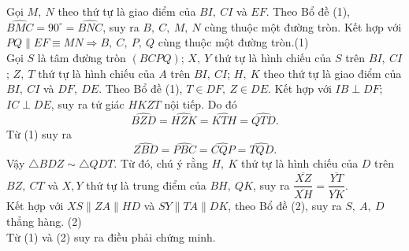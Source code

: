 \begin{bt}
{\begin{center}
		\end{center}
		Gọi $M,~N$ theo thứ tự là giao điểm của $BI,~CI$ và $EF$.
		Theo Bổ đề (1), $\widehat{BMC}=90^\circ=\widehat{BNC}$, suy ra $B,~C,~M,~N$ cùng thuộc một đường tròn.
		Kết hợp với $PQ\parallel EF\equiv MN\Rightarrow B,~C,~P,~Q$ cùng thuộc một đường tròn.\hfill(1)\\
		Gọi $S$ là tâm đường tròn $(BCPQ)$; $X,~Y$ thứ tự là hình chiếu của $S$ trên $BI,~CI$; $Z,~T$ thứ tự là hình chiếu của $A$ trên $BI,~CI$; $H,~K$ theo thứ tự là giao điểm của $BI,~CI$ và $DF,~DE$.
		Theo Bổ đề (1), $T\in DF,~Z\in DE$. Kết hợp với $IB\perp DF$; $IC\perp DE$, suy ra tứ giác $HKZT$ nội tiếp.
		Do đó 
		\[\widehat{BZD}=\widehat{HZK}=\widehat{KTH}=\widehat{QTD}.\] 
		Từ (1) suy ra \[\widehat{ZBD}=\widehat{PBC}=\widehat{CQP}=\widehat{TQD}.\]
		Vậy $\triangle BDZ \sim \triangle QDT$. Từ đó, chú ý rằng $H,~K$ thứ tự là hình chiếu của $D$ trên $BZ,~CT$ và $X,Y$ thứ tự là trung điểm của $BH,~QK$, suy ra $\dfrac{\overline{XZ}}{\overline{XH}}=\dfrac{\overline{YT}}{\overline{YK}}$.\\
		Kết hợp với $XS\parallel ZA\parallel HD$ và $SY\parallel TA\parallel DK$, theo Bổ đề (2), suy ra $S,~A,~D$ thẳng hàng. \hfill(2)\\
		Từ (1) và (2) suy ra điều phải chứng minh.
	}
\end{bt}

